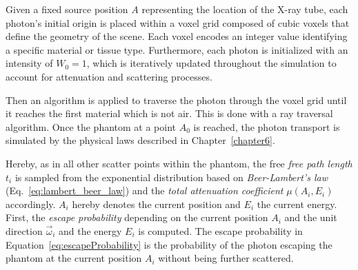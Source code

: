 Given a fixed source position $A$ representing the location of the X-ray tube,
each photon's initial origin is placed within a voxel grid composed of cubic
voxels that define the geometry of the scene. Each voxel encodes an integer
value identifying a specific material or tissue type. Furthermore, each photon
is initialized with an intensity of $W_0=1$, which is iteratively updated
throughout the simulation to account for attenuation and scattering processes.

\begin{figure}[H]
    \centering
\end{figure}

Then an algorithm is applied to traverse the photon through the voxel grid until
it reaches the first material which is not air. This is done with a ray
traversal algorithm. Once the phantom at a point $A_0$ is reached, the photon
transport is simulated by the physical laws described in Chapter~\ref{chapter6}.

Hereby, as in all other scatter points within the phantom, the free \emph{free
path length} $t_i$ is sampled from the exponential distribution based on
\emph{Beer-Lambert's law} (Eq.~\ref{eq:lambert_beer_law}) and the \emph{total
attenuation coefficient} $\mu(A_i, E_i)$ accordingly. $A_i$ hereby denotes the
current position and $E_i$ the current energy. First, the \emph{escape
probability} depending on the current position $A_i$ and the unit direction
$\vec{\omega}_i$ and the energy $E_i$ is computed. The escape probability in
Equation~\ref{eq:escapeProbability} is the probability of the photon escaping
the phantom at the current position $A_i$ without being further scattered.

